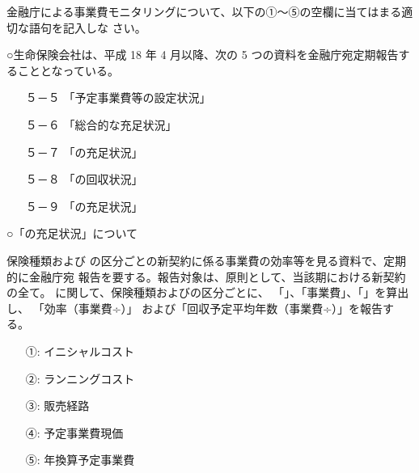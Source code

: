 \documentclass[report,gutter=10mm,fore-edge=10mm,uplatex,dvipdfmx]{jlreq}
\begin{document}
金融庁による事業費モニタリングについて、以下の①～⑤の空欄に当てはまる適切な語句を記入しな
さい。

○生命保険会社は、平成 18 年 4 月以降、次の 5 つの資料を金融庁宛定期報告することとなっている。
\begin{itemize}
\item[] ５－５ 「予定事業費等の設定状況」
\item[] ５－６ 「総合的な充足状況」
\item[] ５－７ 「の充足状況」
\item[] ５－８ 「の回収状況」
\item[] ５－９ 「の充足状況」
\end{itemize}

○「の充足状況」について

保険種類および
の区分ごとの新契約に係る事業費の効率等を見る資料で、定期的に金融庁宛
報告を要する。報告対象は、原則として、当該期における新契約の全て。
に関して、保険種類およびの区分ごとに、
「」、「事業費」、「」を算出し、
「効率（事業費÷）」
および「回収予定平均年数（事業費÷）」を報告する。

\answer{}
\begin{itemize}
\item[ ①: ]  イニシャルコスト
\item[ ②: ]  ランニングコスト
\item[ ③: ]  販売経路
\item[ ④: ]  予定事業費現価
\item[ ⑤: ]  年換算予定事業費
\end{itemize}
\end{document}
